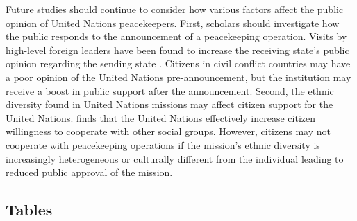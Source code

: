 \documentclass[12pt]{article}
\newcommand{\UN}[1]{United Nations}
\begin{document}
Future studies should continue to consider how various factors affect the public opinion of \UN{} peacekeepers. First, scholars should investigate how the public responds to the announcement of a peacekeeping operation. Visits by high-level foreign leaders have been found to increase the receiving state's public opinion regarding the sending state \citep{goldsmith2021does}. Citizens in civil conflict countries may have a poor opinion of the \UN{} pre-announcement, but the institution may receive a boost in public support after the announcement. Second, the ethnic diversity found in \UN{} missions may affect citizen support for the \UN{}. \cite{nomikos2022peacekeeping} finds that the \UN{} effectively increase citizen willingness to cooperate with other social groups. However, citizens may not cooperate with peacekeeping operations if the mission's ethnic diversity is increasingly heterogeneous or culturally different from the individual leading to reduced public approval of the mission. 

\newpage %
\singlespacing

\clearpage 

\begin{center}
\section*{Tables}
\end{center}

\begin{table}[h]
\renewcommand{\arraystretch}{2.0}
\renewcommand{\arraystretch}{1.0}
\caption{Expectations regarding preferences for the United Nations \label{Hs}}
\end{table}
\end{document}
